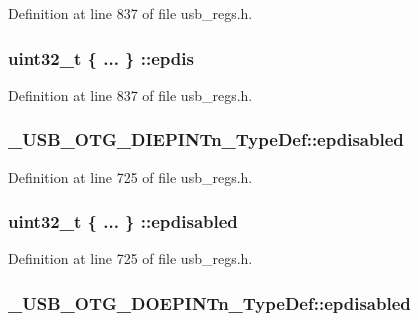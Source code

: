 Definition at line 837 of file usb\-\_\-regs.\-h.

\hypertarget{group___u_s_b___o_t_g___d_r_i_v_e_r_gacf6c5fed375c5747114665003d327da2}{
\subsubsection[{epdis}]{\setlength{\rightskip}{0pt plus 5cm}uint32\-\_\-t \{ ... \} \-::epdis}}\label{group___u_s_b___o_t_g___d_r_i_v_e_r_gacf6c5fed375c5747114665003d327da2}


Definition at line 837 of file usb\-\_\-regs.\-h.

\hypertarget{group___u_s_b___o_t_g___d_r_i_v_e_r_ga300352b16393687c3156329c5448b4b8}{
\subsubsection[{epdisabled}]{ \-\_\-\-U\-S\-B\-\_\-\-O\-T\-G\-\_\-\-D\-I\-E\-P\-I\-N\-Tn\-\_\-\-Type\-Def\-::epdisabled}}\label{group___u_s_b___o_t_g___d_r_i_v_e_r_ga300352b16393687c3156329c5448b4b8}


Definition at line 725 of file usb\-\_\-regs.\-h.

\hypertarget{group___u_s_b___o_t_g___d_r_i_v_e_r_ga3d215d8c84bf262173c9665a25445632}{
\subsubsection[{epdisabled}]{\setlength{\rightskip}{0pt plus 5cm}uint32\-\_\-t \{ ... \} \-::epdisabled}}\label{group___u_s_b___o_t_g___d_r_i_v_e_r_ga3d215d8c84bf262173c9665a25445632}


Definition at line 725 of file usb\-\_\-regs.\-h.

\hypertarget{group___u_s_b___o_t_g___d_r_i_v_e_r_ga8fa33d9d00b0398bb9cffbeef8ed78a9}{
\subsubsection[{epdisabled}]{ \-\_\-\-U\-S\-B\-\_\-\-O\-T\-G\-\_\-\-D\-O\-E\-P\-I\-N\-Tn\-\_\-\-Type\-Def\-::epdisabled}}\label{group___u_s_b___o_t_g___d_r_i_v_e_r_ga8fa33d9d00b0398bb9cffbeef8ed78a9}


